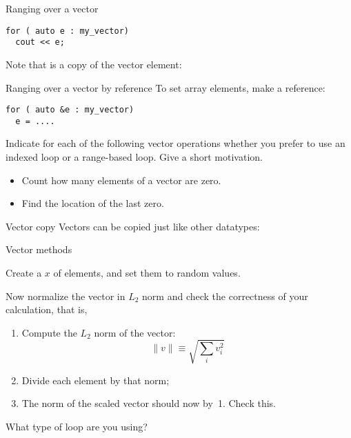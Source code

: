 \begin{block}{Ranging over a vector}
  \label{sl:vector-range}
\begin{verbatim}
for ( auto e : my_vector)
  cout << e;
\end{verbatim}
Note that  is a copy of the vector element:
\end{block}

\begin{block}{Ranging over a vector by reference}
  \label{sl:vector-range-ref}
To set array elements, make  a reference:
\begin{verbatim}
for ( auto &e : my_vector)
  e = ....
\end{verbatim}
\end{block}

\begin{exercise}
  \label{ex:range-for}
  Indicate for each of the following vector operations whether you
  prefer to use an indexed loop or a range-based loop. Give a short
  motivation.
  \begin{itemize}
  \item Count how many elements of a vector are zero.
  \item Find the location of the last zero.
  \end{itemize}
\end{exercise}

\begin{block}{Vector copy}
  \label{sl:vectorcopy}
  Vectors can be copied just like other datatypes:
\end{block}

 {Vector methods}

\begin{exercise}
  \label{ex:vectornormalize}
  Create a  $x$ of  elements, and set them to random
  values.

  Now normalize the vector in $L_2$ norm and check the correctness of
  your calculation, that is,
  \begin{enumerate}
  \item Compute the $L_2$ norm of the vector:
    \[ \| v\| \equiv \sqrt{\sum_iv_i^2} \]
  \item Divide each element by that norm;
  \item The norm of the scaled vector should now by~1. Check this.
  \end{enumerate}
  What type of loop are you using?
\end{exercise}

